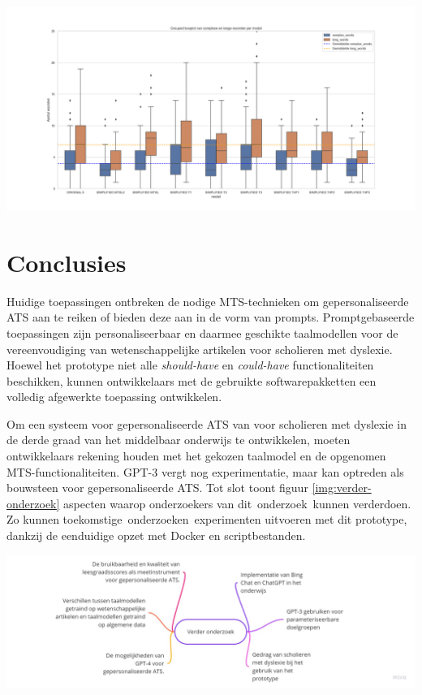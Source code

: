 \documentclass[a0,portrait]{hogent-poster}
\begin{document}
\begin{multicols}{2}
\begin{center}
	\captionsetup{type=figure}
	\includegraphics[width=1.0\linewidth]{figures/boxplot-poster.png}
	\label{img:results}
\end{center}


\section{Conclusies}
Huidige toepassingen ontbreken de nodige MTS-technieken om gepersonaliseerde ATS aan te reiken of bieden deze aan in de vorm van prompts. Promptgebaseerde toepassingen zijn personaliseerbaar en daarmee geschikte taalmodellen voor de vereenvoudiging van wetenschappelijke artikelen voor scholieren met dyslexie. Hoewel het prototype niet alle \textit{should-have} en \textit{could-have} functionaliteiten beschikken, kunnen ontwikkelaars met de gebruikte softwarepakketten een volledig afgewerkte toepassing ontwikkelen.

Om een systeem voor gepersonaliseerde ATS van voor scholieren met dyslexie in de derde graad van het middelbaar onderwijs te ontwikkelen, moeten ontwikkelaars rekening houden met het gekozen taalmodel en de opgenomen MTS-functionaliteiten. GPT-3 vergt nog experimentatie, maar kan optreden als bouwsteen voor gepersonaliseerde ATS. Tot slot toont figuur \ref{img:verder-onderzoek} aspecten waarop onderzoekers van dit onderzoek kunnen verderdoen. Zo kunnen toekomstige onderzoeken experimenten uitvoeren met dit prototype, dankzij de eenduidige opzet met Docker en scriptbestanden.

\begin{center}
	\captionsetup{type=figure}
	\includegraphics[width=1.0\linewidth]{figures/verder-onderzoek.jpg}
	\label{img:verder-onderzoek}
\end{center}

\end{multicols}
\end{document}
